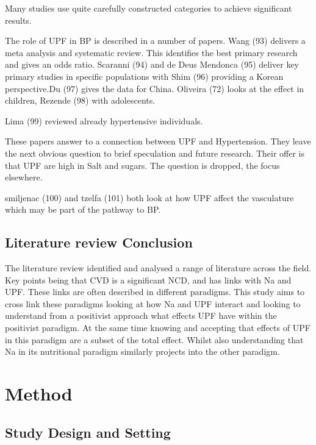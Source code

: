 \documentclass[
]{article}
\begin{document}
Many studies use quite carefully constructed categories to achieve
significant results.

The role of UPF in BP is described in a number of papers. Wang (93)
delivers a meta analysis and systematic review. This identifies the best
primary research and gives an odds ratio. Scaranni (94) and de Deus
Mendonca (95) deliver key primary studies in specific populations with
Shim (96) providing a Korean perspective.Du (97) gives the data for
China. Oliveira (72) looks at the effect in children, Rezende (98) with
adolescents.

Lima (99) reviewed already hypertensive individuals.

These papers answer to a connection between UPF and Hypertension. They
leave the next obvious question to brief speculation and future
research. Their offer is that UPF are high in Salt and sugars. The
question is dropped, the focus elsewhere.

smiljenac (100) and tzelfa (101) both look at how UPF affect the
vasculature which may be part of the pathway to BP.

\hypertarget{literature-review-conclusion}{%
\subsection{Literature review
Conclusion}\label{literature-review-conclusion}}

The literature review identified and analysed a range of literature
across the field. Key points being that CVD is a significant NCD, and
has links with Na and UPF. These links are often described in different
paradigms. This study aims to cross link these paradigms looking at how
Na and UPF interact and looking to understand from a positivist approach
what effects UPF have within the positivist paradigm. At the same time
knowing and accepting that effects of UPF in this paradigm are a subset
of the total effect. Whilst also understanding that Na in its
nutritional paradigm similarly projects into the other paradigm.

\newpage

\hypertarget{method}{%
\section{Method}\label{method}}

\hypertarget{study-design-and-setting}{%
\subsection{Study Design and Setting}\label{study-design-and-setting}}
\end{document}
